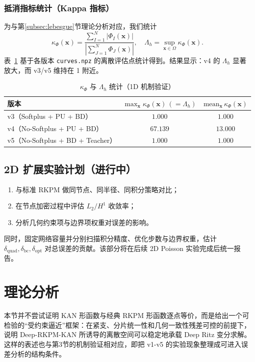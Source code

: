﻿\documentclass[lang=cn,a4paper]{elegantpaper}
\begin{document}
\subsubsection{抵消指标统计（Kappa 指标）}
为与第\ref{subsec:lebesgue}节理论分析对应，我们统计
\begin{equation}
  \kappa_\Phi(\bm{x})=\frac{\sum_{I=1}^{N}|\Phi_I(\bm{x})|}{\left|\sum_{J=1}^{N}\Phi_J(\bm{x})\right|},
  \quad
  \Lambda_h=\sup_{\bm{x}\in\Omega}\kappa_\Phi(\bm{x}).
\end{equation}
表~\ref{tab:kappa-v3-v5} 基于各版本 \texttt{curves.npz} 的离散评估点统计得到。结果显示：v4 的 $\Lambda_h$ 显著放大，而 v3/v5 维持在 1 附近。
\begin{table}[htbp]
  \centering
  \small
  \caption{$\kappa_\Phi$ 与 $\Lambda_h$ 统计（1D 机制验证）}
  \label{tab:kappa-v3-v5}
  \begin{tabular}{lcc}
    \toprule
    版本 & $\max_{\bm{x}}\kappa_\Phi(\bm{x})\,(=\Lambda_h)$ & $\mathrm{mean}_{\bm{x}}\,\kappa_\Phi(\bm{x})$ \\
    \midrule
    v3（Softplus + PU + BD） & $1.000$ & $1.000$ \\
    v4（No-Softplus + PU + BD） & $67.139$ & $13.000$ \\
    v5（No-Softplus + BD + Teacher） & $1.000$ & $1.000$ \\
    \bottomrule
  \end{tabular}
\end{table}

\subsection{2D 扩展实验计划（进行中）}
\begin{enumerate}[label=\arabic*.]
  \item 与标准 RKPM 做同节点、同半径、同积分策略对比；
  \item 在节点加密过程中评估 $L_2/H^1$ 收敛率；
  \item 分析几何约束项与边界项权重对误差的影响。
\end{enumerate}

同时，固定网络容量并分别扫描积分精度、优化步数与边界权重，估计
$\delta_{\mathrm{quad}},\delta_{\mathrm{bc}},\delta_{\mathrm{opt}}$
对总误差的贡献。该部分将在后续 2D Poisson 实验完成后统一报告。
\section{理论分析}
本节并不尝试证明 KAN 形函数与经典 RKPM 形函数逐点等价，而是给出一个可检验的“受约束逼近”框架：在紧支、分片统一性和几何一致性残差可控的前提下，说明 Deep-RKPM-KAN 所诱导的离散空间可以稳定地承载 Deep Ritz 变分求解。这样的表述也与第3节的机制验证相对应，即把 v1-v5 的实验现象整理成可进入误差分析的结构条件。
\end{document}
